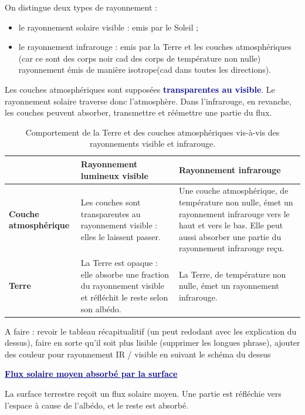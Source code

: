 \documentclass[11pt,a4paper]{article}
\newcommand{\motcle}[1]{\textcolor{DarkBlue}{\textbf{#1}}}
\newcommand{\bloc}[1]{\vspace{0.9em}\noindent\textcolor{DarkBlue}{\underline{\textbf{#1}}}\par\vspace{0.35em}}
\begin{document}
On distingue deux types de rayonnement :

\begin{itemize}
    \item le rayonnement solaire visible : emis par le Soleil ;
    \item le rayonnement infrarouge : emis par la Terre et les couches atmosphériques (car ce sont des corps noir cad des corps de température non nulle) rayonnement émis de manière isotrope(cad dans toutes les directions).
\end{itemize}

Les couches atmosphériques sont supposées \motcle{transparentes au visible}. Le rayonnement solaire traverse donc l'atmosphère. Dans l'infrarouge, en revanche, les couches peuvent absorber, transmettre et réémettre une partie du flux.

\renewcommand{\arraystretch}{1.35}
\begin{table}[H]
\centering
\begin{tabularx}{\textwidth}{>{\bfseries}p{3.2cm} X X}
\hline
 & Rayonnement lumineux visible & Rayonnement infrarouge \\
\hline
Couche atmosphérique
& Les couches sont transparentes au rayonnement visible : elles le laissent passer.
& Une couche atmosphérique, de température non nulle, émet un rayonnement infrarouge vers le haut et vers le bas. Elle peut aussi absorber une partie du rayonnement infrarouge reçu. \\
\hline
Terre
& La Terre est opaque : elle absorbe une fraction du rayonnement visible et réfléchit le reste selon son albédo.
& La Terre, de température non nulle, émet un rayonnement infrarouge. \\
\hline
\end{tabularx}
\caption{Comportement de la Terre et des couches atmosphériques vis-à-vis des rayonnements visible et infrarouge.}
\end{table}
\renewcommand{\arraystretch}{1}

\textcolor{green!50!black}{A faire : revoir le tableau récapitualitif (un peut redodant avec les explication du dessus), faire en sorte qu'il soit plus lisible (supprimer les longues phrase), ajouter des couleur pour rayonnement IR / visible en suivant le schéma du dessus}

\bloc{Flux solaire moyen absorbé par la surface}

La surface terrestre reçoit un flux solaire moyen. Une partie est réfléchie vers l'espace à cause de l'albédo, et le reste est absorbé.
\end{document}
